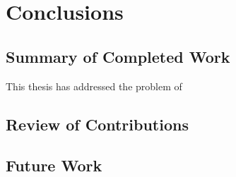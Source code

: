 
\chapter{Conclusions}\label{ch:conclusions} %



\ifpdf
    \graphicspath{{7_conclusions/figures/PNG/}{7_conclusions/figures/PDF/}{7_conclusions/figures/}}
\else
    \graphicspath{{7_conclusions/figures/EPS/}{7_conclusions/figures/}}
\fi




\section{Summary of Completed Work}

This thesis has addressed the problem of 

\section{Review of Contributions}

\section{Future Work}

